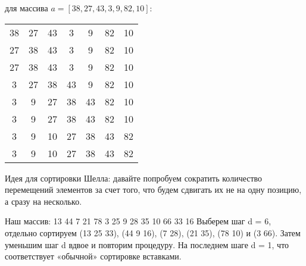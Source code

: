 \begin{eg}
    для массива $a = [38, 27, 43, 3, 9, 82, 10]$:

    \begin{tabular}{ccccccc}
        38 & 27 & 43 & 3 & 9 & 82 & 10 \\
        27 & 38 & 43 & 3 & 9 & 82 & 10 \\
        27 & 38 & 43 & 3 & 9 & 82 & 10 \\
        3 & 27 & 38 & 43 & 9 & 82 & 10 \\
        3 & 9 & 27 & 38 & 43 & 82 & 10 \\
        3 & 9 & 27 & 38 & 43 & 82 & 10 \\
        3 & 9 & 10 & 27 & 38 & 43 & 82 \\
        3 & 9 & 10 & 27 & 38 & 43 & 82 \\
    \end{tabular}
\end{eg}

Идея для сортировки Шелла: давайте попробуем сократить количество перемещений элементов за счет
того, что будем сдвигать их не на одну позицию, а сразу на несколько.

\begin{eg}
    Наш массив: 13  44  7  21  78  3  25  9  28  35  10  66  33  16
    Выберем шаг d = 6, отдельно сортируем (13  25  33), (44  9  16), (7  28), (21  35), (78 
    10) и (3  66).
    Затем уменьшим шаг d вдвое и повторим процедуру. На последнем шаге d = 1, что
    соответствует «обычной» сортировке вставками.
\end{eg}